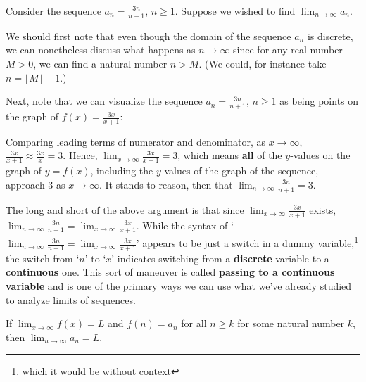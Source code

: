 \documentclass{ximera}
\begin{document}
Consider the sequence $a_{n} = \frac{3n}{n+1}$, $n \geq 1$. Suppose we wished to find $\lim_{n \rightarrow \infty} a_{n}$.



We should first note that even though the domain of the sequence $a_{n}$ is discrete, we can nonetheless discuss what happens as $n \rightarrow \infty$ since for any real number $M>0$, we can find a natural number $n > M$.  (We could, for instance take $n  = \lfloor M \rfloor + 1$.)  



Next, note that we can visualize  the sequence $a_{n} = \frac{3n}{n+1}$, $n \geq 1$ as being points on the graph of $f(x) = \frac{3x}{x+1}$:

\begin{center}
\end{center}

Comparing leading terms of numerator and denominator, as $x \rightarrow \infty$, $\frac{3x}{x+1} \approx \frac{3x}{x} = 3$.   Hence,  $\lim_{x \rightarrow \infty} \frac{3x}{x+1} = 3$, which means \textbf{all} of the $y$-values on the graph of $y = f(x)$, including the $y$-values of the graph of the sequence,  approach $3$ as $x \rightarrow \infty$.  It stands to reason, then that $\lim_{n \rightarrow \infty} \frac{3n}{n+1} = 3$.




The long and short of the above argument is that since $\lim_{x\rightarrow \infty} \frac{3x}{x+1}$ exists, $\lim_{n \rightarrow \infty} \frac{3n}{n+1} = \lim_{x \rightarrow \infty} \frac{3x}{x+1}$.  While the syntax of `$\lim_{n \rightarrow \infty}\frac{3n}{n+1} = \lim_{x \rightarrow \infty} \frac{3x}{x+1}$' appears to be just a switch in a dummy variable,\footnote{which it would be without context}  the switch from `$n$' to `$x$' indicates switching from a \textbf{discrete} variable to a \textbf{continuous} one. This sort of maneuver is called \textbf{passing to a continuous variable} and is one of the primary ways we can use what we've already studied to analyze limits of sequences.  




\begin{theorem}\label{passingtocontinuous}   If $\lim_{x \rightarrow \infty} f(x) = L$  and $f(n) = a_{n}$  for all $n \geq k$ for some natural number $k$, then $\lim_{n \rightarrow \infty} a_{n} = L$.

\end{theorem}
\end{document}
